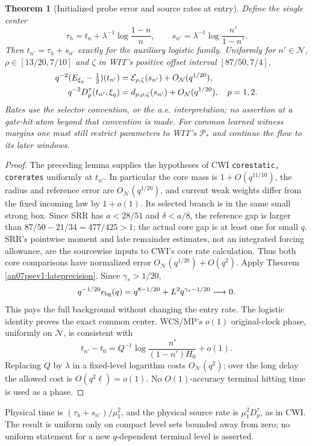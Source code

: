 \documentclass[11pt]{article}
\numberwithin{equation}{section}
\newtheorem{theorem}{Theorem}[section]
\theoremstyle{remark}\newtheorem{remark}[theorem]{Remark}
\begin{document}
\begin{theorem}[Initialized probe error and source rates at entry]
\label{an07psev1:entry}
Define the single center
\[
 \tau_h=t_n+\lambda^{-1}\log\frac{1-n}{n},\qquad
 s_{n'}=\lambda^{-1}\log\frac{n'}{1-n'} .
 \]
Then \(t_{n'}=\tau_h+s_{n'}\) exactly for the auxiliary
logistic family. Uniformly for \(n'\in\mathcal N\),
\(\rho\in[13/20,7/10]\) and \(\zeta\) in WIT's positive
offset interval \([87/50,7/4]\),
\begin{align}
 q^{-2}(E_{\xi_q}-\tfrac12)(t_{n'})
 &=\mathcal E_{\rho,\zeta}(s_{n'})
                             +O_{\mathcal N}(q^{1/20}),\notag\\
 q^{-2}D_p^\tau(t_{n'},\xi_q)
 &=d_{p,\rho,\zeta}(s_{n'})
                             +O_{\mathcal N}(q^{1/20}),\quad p=1,2.
 \label{an07psev1:entrycomparisons}
\end{align}
Rates use the selector convention, or the a.e. interpretation;
no assertion at a gate-hit atom beyond that convention is made.
For common learned witness margins one must still restrict
parameters to WIT's \(\mathcal P_*\) and continue the flow
to its later windows.
\end{theorem}
\begin{proof}
The preceding lemma supplies the hypotheses of CWI
\texttt{corestatic, corerates} uniformly at \(t_{n'}\).
In particular the core mass is \(1+O(q^{11/10})\), the
radius and reference error are \(O_{\mathcal N}(q^{1/20})\),
and current weak weights differ from the fixed incoming law
by \(1+o(1)\). Its selected branch is in the same small
strong box. Since SRR has \(a<28/51\) and \(\delta<a/8\),
the reference gap is larger than
\(87/50-21/34=477/425>1\); the actual core gap is at least
one for small \(q\). SRR's pointwise moment and late
remainder estimates, not an integrated forcing allowance,
are the sourcewise inputs to CWI's core rate calculation.
Thus both core comparisons have normalized error
\(O_{\mathcal N}(q^{1/20})+O(q^2)\).
Apply Theorem \ref{an07psev1:lateprecision}.
Since \(\gamma_*>1/20\),
\[
 q^{-1/20}\epsilon_{\rm bg}(q)
 =q^{8-1/20}+L^2q^{\gamma_*-1/20}\longrightarrow0 .
 \]
This pays the full background without changing the entry rate.
The logistic identity proves the exact common center.
WCS/MP's \(o(1)\) original-clock phase, uniformly on
\(\mathcal N\), is consistent with
\[
 t_{n'}-t_0=Q^{-1}\log\frac{n'}{(1-n')H_0}+o(1).
 \]
Replacing \(Q\) by \(\lambda\) in a fixed-level logarithm
costs \(O_{\mathcal N}(q^2)\); over the long delay the
allowed cost is \(O(q^2\ell)=o(1)\).
No \(O(1)\)-accuracy terminal hitting time is used as a phase.
\end{proof}
Physical time is \((\tau_h+s_{n'})/\mu_1^2\), and the physical
source rate is \(\mu_1^2D_p^\tau\), as in CWI. The result is
uniform only on compact level sets bounded away from zero;
no uniform statement for a new \(q\)-dependent terminal level
is asserted.
\end{document}
